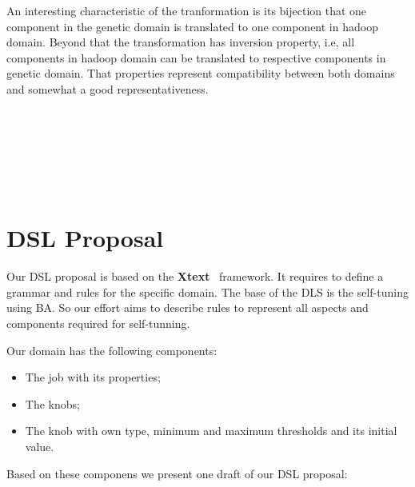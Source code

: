 An interesting characteristic of the tranformation is its bijection that one
component in the genetic domain is translated to one component in hadoop domain. Beyond
that the transformation has inversion property, i.e, all components in hadoop domain
can be translated to respective components in genetic domain. That properties
represent compatibility between both domains and somewhat a good representativeness.
\\
\\
\\
\\
\\
\\
\\
\section{DSL Proposal}

Our DSL proposal is based on the \textbf{Xtext}~\cite{xtext} framework. It requires
to define a grammar and rules for the specific domain. The base of the DLS is the
self-tuning using BA. So our effort aims to describe rules to represent all aspects
and components required for self-tunning.

Our domain has the following components:

\begin{itemize} 
    \item The job with its properties;
    \item The knobs;
    \item The knob with own type, minimum and maximum thresholds and its initial value.
\end{itemize}

Based on these componens we present one draft of our DSL proposal:

